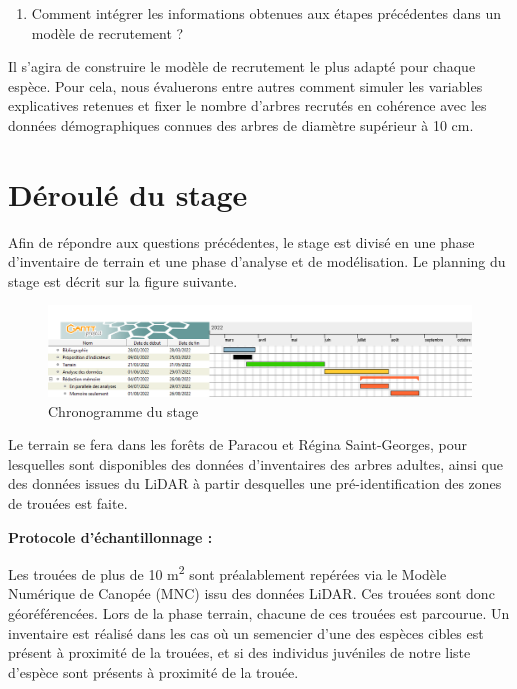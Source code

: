 \documentclass[
  12pt,
  american,
  a4paper,
  extrafontsizes,onecolumn,openright
  ]{memoir}
\providecommand{\tightlist}{%
  \setlength{\itemsep}{0pt}\setlength{\parskip}{0pt}}
\begin{document}
\begin{enumerate}
\def\labelenumi{\arabic{enumi})}
\setcounter{enumi}{1}
\tightlist
\item
  Comment intégrer les informations obtenues aux étapes précédentes dans un modèle de recrutement ?
\end{enumerate}

Il s'agira de construire le modèle de recrutement le plus adapté pour chaque espèce. Pour cela, nous évaluerons entre autres comment simuler les variables explicatives retenues et fixer le nombre d'arbres recrutés en cohérence avec les données démographiques connues des arbres de diamètre supérieur à 10 cm.

\hypertarget{duxe9rouluxe9-du-stage}{%
\section{Déroulé du stage}\label{duxe9rouluxe9-du-stage}}

Afin de répondre aux questions précédentes, le stage est divisé en une phase d'inventaire de terrain et une phase d'analyse et de modélisation. Le planning du stage est décrit sur la figure suivante.

\scriptsize

\begin{figure}

{\centering \includegraphics[width=1\linewidth]{images/chronogramme} 

}

\caption{Chronogramme du stage}\label{fig:planning}
\end{figure}

\normalsize

Le terrain se fera dans les forêts de Paracou et Régina Saint-Georges, pour lesquelles sont disponibles des données d'inventaires des arbres adultes, ainsi que des données issues du LiDAR à partir desquelles une pré-identification des zones de trouées est faite.

\textbf{Protocole d'échantillonnage :}

Les trouées de plus de 10 m\textsuperscript{2} sont préalablement repérées via le Modèle Numérique de Canopée (MNC) issu des données LiDAR. Ces trouées sont donc géoréférencées. Lors de la phase terrain, chacune de ces trouées est parcourue. Un inventaire est réalisé dans les cas où un semencier d'une des espèces cibles est présent à proximité de la trouées, et si des individus juvéniles de notre liste d'espèce sont présents à proximité de la trouée.
\end{document}
